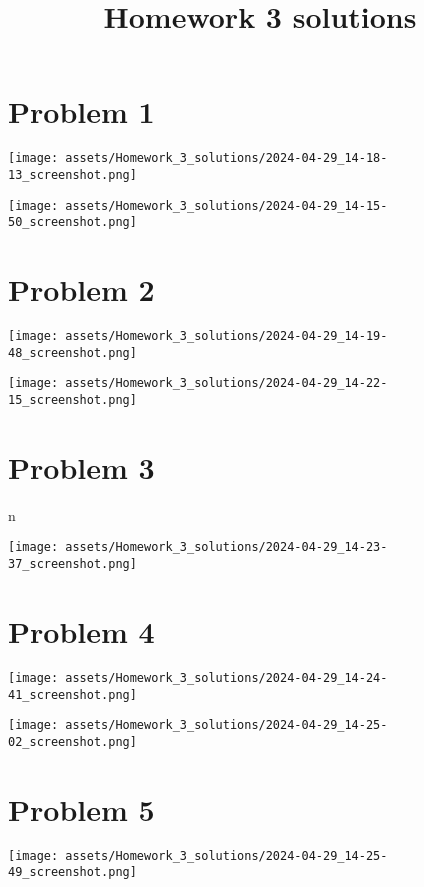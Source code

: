 \documentclass{amsart}
\date{}
\title{Homework 3 solutions}
\begin{document}
\maketitle
\section{Problem 1}
\label{sec:org5809c5c}
\begin{center}
\texttt{[image: assets/Homework\_3\_solutions/2024-04-29\_14-18-13\_screenshot.png]}
\end{center}

\begin{center}
\texttt{[image: assets/Homework\_3\_solutions/2024-04-29\_14-15-50\_screenshot.png]}
\end{center}
\section{Problem 2}
\label{sec:org449260c}

\begin{center}
\texttt{[image: assets/Homework\_3\_solutions/2024-04-29\_14-19-48\_screenshot.png]}
\end{center}

\begin{center}
\texttt{[image: assets/Homework\_3\_solutions/2024-04-29\_14-22-15\_screenshot.png]}
\end{center}
\section{Problem 3}
\label{sec:org4da7115}

n\begin{center}
\texttt{[image: assets/Homework\_3\_solutions/2024-04-29\_14-23-37\_screenshot.png]}
\end{center}
\section{Problem 4}
\label{sec:orgfb32f8a}

\begin{center}
\texttt{[image: assets/Homework\_3\_solutions/2024-04-29\_14-24-41\_screenshot.png]}
\end{center}


\begin{center}
\texttt{[image: assets/Homework\_3\_solutions/2024-04-29\_14-25-02\_screenshot.png]}
\end{center}
\section{Problem 5}
\label{sec:org0fd922c}

\begin{center}
\texttt{[image: assets/Homework\_3\_solutions/2024-04-29\_14-25-49\_screenshot.png]}
\end{center}
\end{document}
